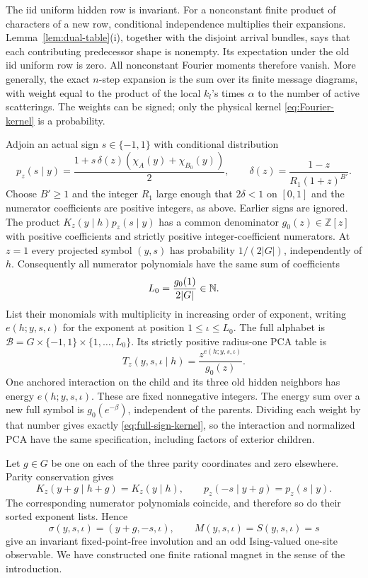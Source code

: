 The iid uniform hidden row is invariant. For a nonconstant finite product of characters of a new row, conditional independence multiplies their expansions. Lemma~\ref{lem:dual-table}(i), together with the disjoint arrival bundles, says that each contributing predecessor shape is nonempty. Its expectation under the old iid uniform row is zero. All nonconstant Fourier moments therefore vanish. More generally, the exact \(n\)-step expansion is the sum over its finite message diagrams, with weight equal to the product of the local \(k_l\)'s times \(\alpha\) to the number of active scatterings. The weights can be signed; only the physical kernel \eqref{eq:Fourier-kernel} is a probability.

Adjoin an actual sign \(s\in\{-1,1\}\) with conditional distribution
\begin{equation}\label{eq:sign-readout}
 p_z(s\mid y)=\frac{1+s\,\delta(z)(\chi_A(y)+\chi_{B_0}(y))}{2},\qquad
 \delta(z)=\frac{1-z}{R_1(1+z)^{B'}}.
\end{equation}
Choose \(B'\ge1\) and the integer \(R_1\) large enough that \(2\delta<1\) on \([0,1]\) and the numerator coefficients are positive integers, as above. Earlier signs are ignored. The product \(K_z(y\mid h)p_z(s\mid y)\) has a common denominator \(g_0(z)\in\mathbb Z[z]\) with positive coefficients and strictly positive integer-coefficient numerators. At \(z=1\) every projected symbol \((y,s)\) has probability \(1/(2|G|)\), independently of \(h\). Consequently all numerator polynomials have the same sum of coefficients
\[
 L_0=\frac{g_0(1)}{2|G|}\in\mathbb N.
\]
List their monomials with multiplicity in increasing order of exponent, writing \(e(h;y,s,\iota)\) for the exponent at position \(1\le\iota\le L_0\). The full alphabet is \(\mathcal B=G\times\{-1,1\}\times\{1,\ldots,L_0\}\). Its strictly positive radius-one PCA table is
\begin{equation}\label{eq:full-sign-kernel}
 T_z(y,s,\iota\mid h)=\frac{z^{e(h;y,s,\iota)}}{g_0(z)}.
\end{equation}
One anchored interaction on the child and its three old hidden neighbors has energy \(e(h;y,s,\iota)\). These are fixed nonnegative integers. The energy sum over a new full symbol is \(g_0(e^{-\beta})\), independent of the parents. Dividing each weight by that number gives exactly \eqref{eq:full-sign-kernel}, so the interaction and normalized PCA have the same specification, including factors of exterior children.

Let \(g\in G\) be one on each of the three parity coordinates and zero elsewhere. Parity conservation gives
\[
 K_z(y+g\mid h+g)=K_z(y\mid h),\qquad
 p_z(-s\mid y+g)=p_z(s\mid y).
\]
The corresponding numerator polynomials coincide, and therefore so do their sorted exponent lists. Hence
\[
 \sigma(y,s,\iota)=(y+g,-s,\iota),\qquad M(y,s,\iota)=S(y,s,\iota)=s
\]
give an invariant fixed-point-free involution and an odd Ising-valued one-site observable. We have constructed one finite rational magnet in the sense of the introduction.

